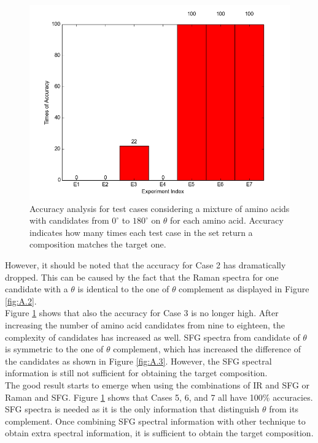 \begin{figure}[!ht]
\centering
\includegraphics[scale=0.7]{Figures/accuracy_pecent_result10_mixture.png}
\caption{Accuracy analysis for test cases considering a mixture of amino acids with candidates from $0^{\circ}$ to $180^{\circ}$ on $\theta$ for each amino acid. Accuracy indicates how many times each test case in the set return a composition matches the target one.} \label{fig:5.3}
\end{figure}

However, it should be noted that the accuracy for Case 2 has dramatically dropped. This can be caused by the fact that the Raman spectra for one candidate with a $\theta$ is identical to the one of $\theta$ complement as displayed in Figure \ref{fig:A.2}. \\

Figure \ref{fig:5.3} shows that also the accuracy for Case 3 is no longer high. After increasing the number of amino acid candidates from nine to eighteen, the complexity of candidates has increased as well. SFG spectra from candidate of $\theta$ is symmetric to the one of $\theta$ complement, which has increased the difference of the candidates as shown in Figure \ref{fig:A.3}. However, the SFG spectral information is still not sufficient for obtaining the target composition. \\

The good result starts to emerge when using the combinations of IR and SFG or Raman and SFG. Figure \ref{fig:5.3} shows that Cases 5, 6, and 7 all have 100\% accuracies. SFG spectra is needed as it is the only information that distinguish $\theta$ from its complement. Once combining SFG spectral information with other technique to obtain extra spectral information, it is sufficient to obtain the target composition. \\

